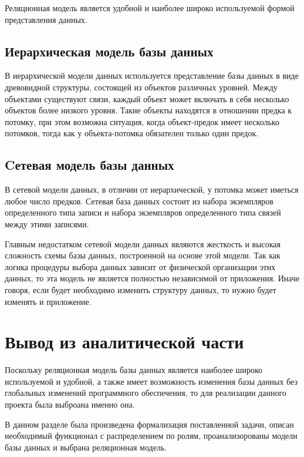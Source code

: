 Реляционная модель является удобной и наиболее широко используемой формой представления данных.


\subsection{Иерархическая модель базы данных}
В иерархической модели данных используется представление базы данных в виде древовидной структуры, состоящей из объектов различных уровней. Между объектами существуют связи, каждый объект может включать в себя несколько объектов более низкого уровня. Такие объекты находятся в отношении предка к потомку, при этом возможна ситуация, когда объект-предок имеет несколько потомков, тогда как у объекта-потомка обязателен только один предок.


\subsection{Cетевая модель базы данных}
В сетевой модели данных, в отличии от иерархической, у потомка может иметься любое число предков. Сетевая база данных состоит из набора экземпляров определенного типа записи и набора экземпляров определенного типа связей между этими записями.

Главным недостатком сетевой модели данных являются жесткость и высокая сложность схемы базы данных, построенной на основе этой модели. Так как логика процедуры выбора данных зависит от физической организации этих данных, то эта модель не является полностью независимой от приложения. Иначе говоря, если будет необходимо изменить структуру данных, то нужно будет изменять и приложение.


\section*{Вывод из аналитической части}
Поскольку реляционная модель базы данных является наиболее широко используемой и удобной, а также имеет возможность изменения базы данных без глобальных изменений программного обеспечения, то для реализации данного проекта была выброана именно она.

В данном разделе была произведена формализация поставленной задачи, описан необходимый функционал с распределением по ролям, проанализорованы модели базы данных и выбрана реляционная модель.